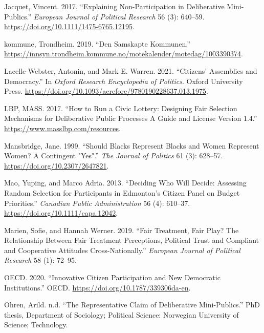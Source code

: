 \documentclass[
  12pt,
  a4paper, 12pt]{article}
\newlength{\cslhangindent}
\newlength{\cslentryspacingunit} %
\newenvironment{CSLReferences}[2] %
 {%
  \setlength{\parindent}{0pt}
  \ifodd #1
  \let\oldpar\par
  \def\par{\hangindent=\cslhangindent\oldpar}
  \fi
  \setlength{\parskip}{#2\cslentryspacingunit}
 }%
 {}
\begin{document}
\begin{CSLReferences}{1}{0}
\leavevmode{}%
Jacquet, Vincent. 2017. {``Explaining Non-Participation in Deliberative Mini-Publics.''} \emph{European Journal of Political Research} 56 (3): 640--59. \url{https://doi.org/10.1111/1475-6765.12195}.

\leavevmode{}%
kommune, Trondheim. 2019. {``Den Samskapte Kommunen.''} \url{https://innsyn.trondheim.kommune.no/motekalender/motedag/1003390374}.

\leavevmode{}%
Lacelle-Webster, Antonin, and Mark E. Warren. 2021. {``Citizens' {Assemblies} and {Democracy}.''} In \emph{Oxford {Research} {Encyclopedia} of {Politics}}. Oxford University Press. \url{https://doi.org/10.1093/acrefore/9780190228637.013.1975}.

\leavevmode{}%
LBP, MASS. 2017. {``How to Run a {Civic} {Lottery}: {Designing} Fair Selection Mechanisms for Deliberative Public Processes {A} {Guide} and {License} {Version} 1.4.''} \url{https://www.masslbp.com/resources}.

\leavevmode{}%
Mansbridge, Jane. 1999. {``Should {Blacks} {Represent} {Blacks} and {Women} {Represent} {Women}? {A} {Contingent} "{Yes}".''} \emph{The Journal of Politics} 61 (3): 628--57. \url{https://doi.org/10.2307/2647821}.

\leavevmode{}%
Mao, Yuping, and Marco Adria. 2013. {``Deciding Who Will Decide: {Assessing} Random Selection for Participants in {Edmonton}'s {Citizen} {Panel} on Budget Priorities.''} \emph{Canadian Public Administration} 56 (4): 610--37. \url{https://doi.org/10.1111/capa.12042}.

\leavevmode{}%
Marien, Sofie, and Hannah Werner. 2019. {``Fair Treatment, Fair Play? The Relationship Between Fair Treatment Perceptions, Political Trust and Compliant and Cooperative Attitudes Cross-Nationally.''} \emph{European Journal of Political Research} 58 (1): 72--95.

\leavevmode{}%
OECD. 2020. {``Innovative {Citizen} {Participation} and {New} {Democratic} {Institutions}.''} OECD. \url{https://doi.org/10.1787/339306da-en}.

\leavevmode{}%
Ohren, Arild. n.d. {``The {Representative} {Claim} of {Deliberative} {Mini}-{Publics}.''} PhD thesis, Department of Sociology; Political Science: Norwegian University of Science; Technology.


\end{CSLReferences}
\end{document}
